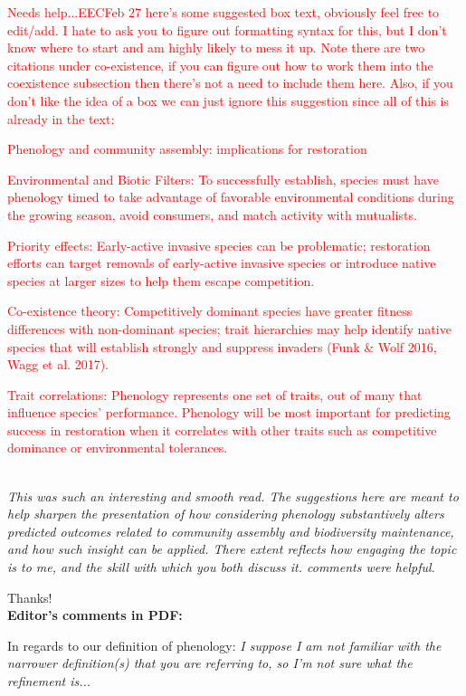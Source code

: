 \documentclass[11pt]{article}
\begin{document}
\textcolor{red}{Needs help...EECFeb 27 here's some suggested box text, obviously feel free to edit/add. I hate to ask you to figure out formatting syntax for this, but I don't know where to start and am highly likely to mess it up. Note there are two citations under co-existence, if you can figure out how to work them into the coexistence subsection then there's not a need to include them here. Also, if you don't like the idea of a box we can just ignore this suggestion since all of this is already in the text:

Phenology and community assembly: implications for restoration

Environmental and Biotic Filters: To successfully establish, species must have phenology timed to take advantage of favorable environmental conditions during the growing season, avoid consumers, and match activity with mutualists.

Priority effects: Early-active invasive species can be problematic; restoration efforts can target removals of early-active invasive species or introduce native species at larger sizes to help them escape competition.

Co-existence theory: Competitively dominant species have greater fitness differences with non-dominant species; trait hierarchies may help identify native species that will establish strongly and suppress invaders (Funk & Wolf 2016, Wagg et al. 2017).

Trait correlations: Phenology represents one set of traits, out of many that influence species’ performance. Phenology will be most important for predicting success in restoration when it correlates with other traits such as competitive dominance or environmental tolerances.
}\\

\emph{This was such an interesting and smooth read. The suggestions here are meant to help sharpen the presentation of how considering phenology substantively alters predicted outcomes related to community assembly and biodiversity maintenance, and how such insight
can be applied. There extent reflects how engaging the topic is to me, and the skill with which you both discuss it. comments were helpful.}

Thanks!\\

{\bf Editor's comments in PDF:} 

In regards to our definition of phenology: \emph{I suppose I am not familiar with the narrower definition(s) that you are referring to, so I'm not sure what the refinement is... }
\end{document}
